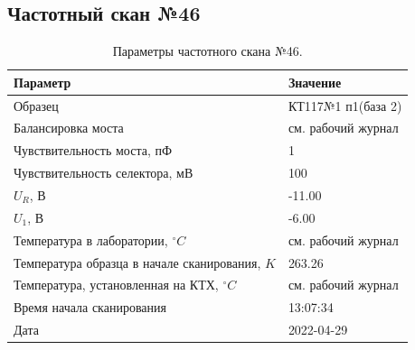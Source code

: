 \subsection{Частотный скан №46}
\begin{table}[!ht]
    \centering
    \caption{Параметры частотного скана №46.}
    \begin{tabular}{|l|l|}
        \hline
        Параметр                                       & Значение                  \\ \hline
        Образец                                        & КТ117№1 п1(база 2)        \\ \hline
        Балансировка моста                             & см. рабочий журнал        \\ \hline
        Чувствительность моста, пФ                     & 1                         \\ \hline
        Чувствительность селектора, мВ                 & 100                       \\ \hline
        $U_R$, В                                       & -11.00                    \\ \hline
        $U_1$, В                                       & -6.00                     \\ \hline
        Температура в лаборатории, $^\circ C$          & см. рабочий журнал        \\ \hline
        Температура образца в начале сканирования, $K$ & 263.26                    \\ \hline
        Температура, установленная на КТХ, $^\circ C$  & см. рабочий журнал        \\ \hline
        Время начала сканирования                      & 13:07:34                  \\ \hline
        Дата                                           & 2022-04-29                \\ \hline
    \end{tabular}
    \label{table:frequency_scan_46}
\end{table}

